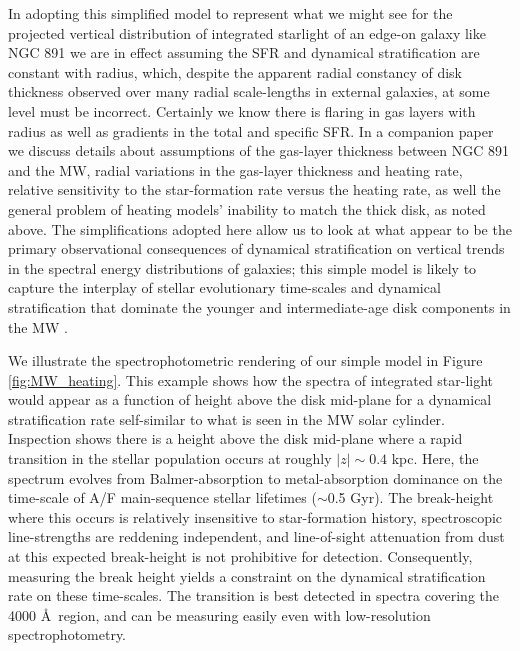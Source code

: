 In adopting this simplified model to represent what we might see for
the projected vertical distribution of integrated starlight of an
edge-on galaxy like NGC 891 we are in effect assuming the SFR and
dynamical stratification are constant with radius, which, despite the
apparent radial constancy of disk thickness observed over many radial
scale-lengths in external galaxies, at some level must be
incorrect. Certainly we know there is flaring in gas layers with
radius as well as gradients in the total and specific SFR.  In a
companion paper we discuss details about assumptions of the gas-layer
thickness between NGC 891 and the MW, radial variations in the
gas-layer thickness and heating rate, relative sensitivity to the
star-formation rate versus the heating rate, as well the general
problem of heating models' inability to match the thick disk, as noted
above. The simplifications adopted here allow us to look at what
appear to be the primary observational consequences of dynamical
stratification on vertical trends in the spectral energy distributions
of galaxies; this simple model is likely to capture the interplay of
stellar evolutionary time-scales and dynamical stratification that
dominate the younger and intermediate-age disk components in the MW
\citep{Bird13}.

We illustrate the spectrophotometric rendering of our simple model in
Figure \ref{fig:MW_heating}.  This example shows how the spectra of
integrated star-light would appear as a function of height above the
disk mid-plane for a dynamical stratification rate self-similar to what
is seen in the MW solar cylinder. Inspection shows there is a height
above the disk mid-plane where a rapid transition in the stellar
population occurs at roughly $|z| \sim 0.4$ kpc.  Here, the spectrum
evolves from Balmer-absorption to metal-absorption dominance on the
time-scale of A/F main-sequence stellar lifetimes ($\sim$0.5 Gyr). The
break-height where this occurs is relatively insensitive to
star-formation history, spectroscopic line-strengths are reddening
independent, and line-of-sight attenuation from dust at this expected
break-height is not prohibitive for detection.  Consequently,
measuring the break height yields a constraint on the dynamical
stratification rate on these time-scales. The transition is best
detected in spectra covering the 4000 \AA\ region, and can be
measuring easily even with low-resolution spectrophotometry.

